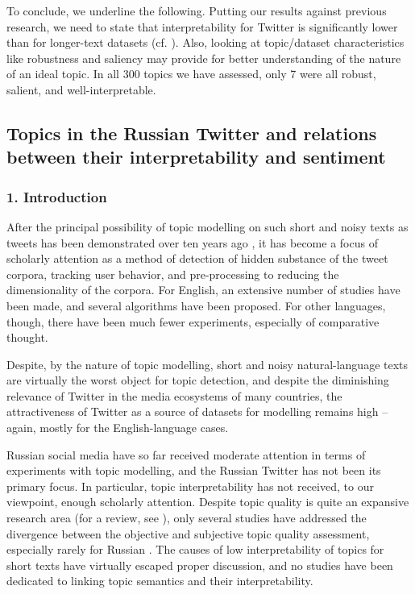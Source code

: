 To conclude, we underline the following. Putting our results against previous research, we need to state that interpretability for Twitter is significantly lower than for longer-text datasets (cf. \cite{KoltsovaKoltcov}). Also, looking at topic/dataset characteristics like robustness and saliency may provide for better understanding of the nature of an ideal topic. In all 300 topics we have assessed, only 7 were all robust, salient, and well-interpretable.

\subsection{Topics in the Russian Twitter and relations between their interpretability and sentiment}\label{subsec:ch5/sec2/sub4}

\subsubsection{1. Introduction}

After the principal possibility of topic modelling on such short and noisy texts as tweets has been demonstrated over ten years ago \cite{RamageDumaisLiebling}, it has become a focus of scholarly attention as a method of detection of hidden substance of the tweet corpora, tracking user behavior, and pre-processing to reducing the dimensionality of the corpora. For English, an extensive number of studies have been made, and several algorithms have been proposed. For other languages, though, there have been much fewer experiments, especially of comparative thought.

Despite, by the nature of topic modelling, short and noisy natural-language texts are virtually the worst object for topic detection, and despite the diminishing relevance of Twitter in the media ecosystems of many countries, the attractiveness of Twitter as a source of datasets for modelling remains high -- again, mostly for the English-language cases.

Russian social media have so far received moderate attention in terms of experiments with topic modelling, and the Russian Twitter has not been its primary focus. In particular, topic interpretability has not received, to our viewpoint, enough scholarly attention. Despite topic quality is quite an expansive research area (for a review, see \cite{MavrinFilchenkovKoltcov}), only several studies have addressed the divergence between the objective and subjective topic quality assessment, especially rarely for Russian \cite{BodrunovaKoltcovKoltsova}. The causes of low interpretability of topics for short texts have virtually escaped proper discussion, and no studies have been dedicated to linking topic semantics and their interpretability.

